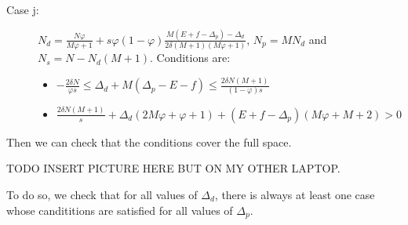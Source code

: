 \documentclass[english, a4paper]{article}
\theoremstyle{plain}
\theoremstyle{definition}
\theoremstyle{remark}
\begin{document}
\begin{description}
    \item [Case j:] \label{dis_case_j} $N_d = \frac{N \varphi}{M\varphi + 1} + s\varphi (1 - \varphi) \frac{M(E + f - \Delta_p) - \Delta_d}{2\delta (M + 1)(M\varphi + 1)}$, $N_p = M N_d$ and $N_s = N - N_d(M + 1)$. Conditions are:
    \begin{itemize}
        \item $-\frac{2\delta N}{\varphi s} \leq \Delta_d + M(\Delta_p - E - f) \leq \frac{2\delta N (M + 1)}{(1-\varphi)s}$
        \item $\frac{2\delta N(M+1)}{s} + \Delta_d(2M\varphi + \varphi + 1) + (E + f - \Delta_p)(M\varphi + M + 2) > 0$
    \end{itemize}
\end{description}

Then we can check that the conditions cover the full space.

TODO INSERT PICTURE HERE BUT ON MY OTHER LAPTOP.

To do so, we check that for all values of $\Delta_d$, there is always at least one case whose candititions are satisfied for all values of $\Delta_p$.
\end{document}
